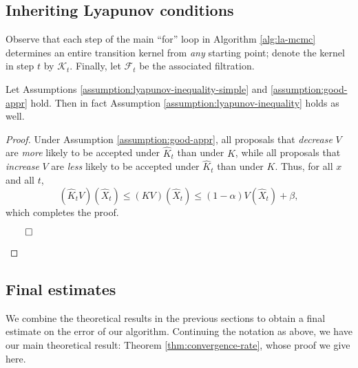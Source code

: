 \subsection{Inheriting Lyapunov conditions} \label{SubsecInheritLyap}

Observe that each step of the main ``for'' loop in Algorithm \ref{alg:la-mcmc} determines an entire transition kernel from \textit{any} starting point; denote the kernel in step $t$ by $\mathcal{K}_{t}$. Finally, let $\mathcal{F}_{t}$ be the associated filtration.

\begin{lemma} \label{LemmaLyapSimpleGen}
Let Assumptions \ref{assumption:lyapunov-inequality-simple} and \ref{assumption:good-appr} hold. Then in fact Assumption \ref{assumption:lyapunov-inequality} holds as well. 
\label{lem:lyapunov-correction}
\end{lemma}
\begin{proof}
Under Assumption \ref{assumption:good-appr}, all proposals that \textit{decrease} $V$ are \textit{more} likely to be accepted under $\hat{K}_{t}$ than under $K$, while all proposals that \textit{increase} $V$ are \textit{less} likely to be accepted under $\hat{K}_{t}$ than under $K$. Thus, for all $x$ and all $t$,
\begin{equation}
(\hat{K}_{t}V)(\hat{X}_{t}) \leq (KV)(\hat{X}_{t}) \leq (1 - \alpha) V(\hat{X}_{t}) + \beta,
\end{equation}
which completes the proof.
\begin{flushright}$\qed$\end{flushright}
\end{proof}

\subsection{Final estimates}

We combine the theoretical results in the previous sections to obtain a final estimate on the error of our algorithm. Continuing the notation as above, we have our main theoretical result: Theorem \ref{thm:convergence-rate}, whose proof we give here.

